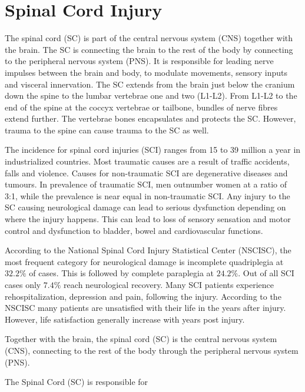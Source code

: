 
\section{Spinal Cord Injury}

The spinal cord (SC) is part of the central nervous system (CNS) together with the brain. The SC is connecting the brain to the rest of the body by connecting to the peripheral nervous system (PNS). It is responsible for leading nerve impulses between the brain and body, to modulate movements, sensory inputs and visceral innervation. The SC extends from the brain just below the cranium down the spine to the lumbar vertebrae one and two (L1-L2). From L1-L2 to the end of the spine at the coccyx vertebrae or tailbone, bundles of nerve fibres extend further. The vertebrae bones encapsulates and protects the SC. However, trauma to the spine can cause trauma to the SC as well. \cite{Weidner2017}

The incidence for spinal cord injuries (SCI) ranges from 15 to 39 million a year in industrialized countries. Most traumatic causes are a result of traffic accidents, falls and violence. Causes for non-traumatic SCI are degenerative diseases and tumours. In prevalence of traumatic SCI, men outnumber women at a ratio of 3:1, while the prevalence is near equal in non-traumatic SCI. Any injury to the SC causing neurological damage can lead to serious dysfunction depending on where the injury happens. This can lead to loss of sensory sensation and motor control and dysfunction to bladder, bowel and cardiovascular functions. \cite{Weidner2017}

According to the National Spinal Cord Injury Statistical Center (NSCISC), the most frequent category for neurological damage is incomplete quadriplegia at $32.2\%$ of cases. This is followed by complete paraplegia at $24.2\%$. Out of all SCI cases only $7.4\%$ reach neurological recovery. \cite{NSCISC2017} %
Many SCI patients experience rehospitalization, depression and pain, following the injury. According to the NSCISC many patients are unsatisfied with their life in the years after injury. However, life satisfaction generally increase with years post injury. \cite{NSCISC2017}






Together with the brain, the spinal cord (SC) is the central nervous system (CNS), connecting to the rest of the body through the peripheral nervous system (PNS). 

The Spinal Cord (SC) is responsible for 



